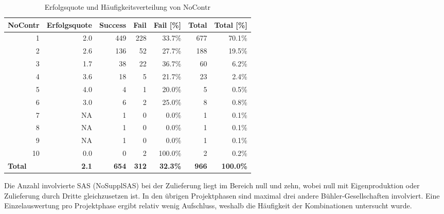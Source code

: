 \begin{table}[H]
	\centering
	\caption{Erfolgsquote und Häufigkeitsverteilung von NoContr}
	\begin{tabular}{lrrrrrr}
		\textbf{NoContr} & \multicolumn{1}{l}{\textbf{Erfolgsquote}} & \multicolumn{1}{l}{\textbf{Success}} & \multicolumn{1}{l}{\textbf{Fail}} & \multicolumn{1}{l}{\textbf{Fail [\%]}} & \multicolumn{1}{l}{\textbf{Total}} & \multicolumn{1}{l}{\textbf{Total [\%]}} \\\hline
		\multicolumn{1}{r}{1} & 2.0   & 449   & 228   & 33.7\% & 677   & 70.1\% \\
		\multicolumn{1}{r}{2} & 2.6   & 136   & 52    & 27.7\% & 188   & 19.5\% \\
		\multicolumn{1}{r}{3} & 1.7   & 38    & 22    & 36.7\% & 60    & 6.2\% \\
		\multicolumn{1}{r}{4} & 3.6   & 18    & 5     & 21.7\% & 23    & 2.4\% \\
		\multicolumn{1}{r}{5} & 4.0   & 4     & 1     & 20.0\% & 5     & 0.5\% \\
		\multicolumn{1}{r}{6} & 3.0   & 6     & 2     & 25.0\% & 8     & 0.8\% \\
		\multicolumn{1}{r}{7} & NA    & 1     & 0     & 0.0\% & 1     & 0.1\% \\
		\multicolumn{1}{r}{8} & NA    & 1     & 0     & 0.0\% & 1     & 0.1\% \\
		\multicolumn{1}{r}{9} & NA    & 1     & 0     & 0.0\% & 1     & 0.1\% \\
		\multicolumn{1}{r}{10} & 0.0   & 0     & 2     & 100.0\% & 2     & 0.2\% \\\hline
		\textbf{Total} & \textbf{2.1} & \textbf{654} & \textbf{312} & \textbf{32.3\%} & \textbf{966} & \textbf{100.0\%} \\
	\end{tabular}%
	\label{fnocontr}%
\end{table}%
%
%
Die Anzahl involvierte SAS (NoSupplSAS) bei der Zulieferung liegt im Bereich null und zehn, wobei null mit Eigenproduktion oder Zulieferung durch Dritte gleichzusetzen ist. In den übrigen Projektphasen sind maximal drei andere Bühler-Gesellschaften involviert. Eine Einzelauswertung pro Projektphase ergibt relativ wenig Aufschluss, weshalb die Häufigkeit der Kombinationen untersucht wurde. 
